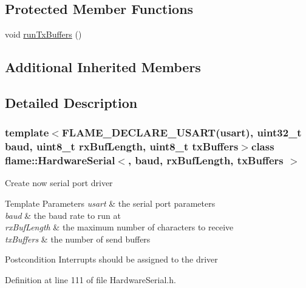 \subsection*{Protected Member Functions}
\begin{DoxyCompactItemize}
\item 
void \hyperlink{classflame_1_1_hardware_serial_a2f045cdba4a0be78d876e383ff1ec6f2}{run\-Tx\-Buffers} ()
\end{DoxyCompactItemize}
\subsection*{Additional Inherited Members}


\subsection{Detailed Description}
\subsubsection*{template$<$F\-L\-A\-M\-E\-\_\-\-D\-E\-C\-L\-A\-R\-E\-\_\-\-U\-S\-A\-R\-T(usart), uint32\-\_\-t baud, uint8\-\_\-t rx\-Buf\-Length, uint8\-\_\-t tx\-Buffers$>$class flame\-::\-Hardware\-Serial$<$, baud, rx\-Buf\-Length, tx\-Buffers $>$}

Create now serial port driver 
\begin{DoxyTemplParams}{Template Parameters}
{\em usart} & the serial port parameters \\
\hline
{\em baud} & the baud rate to run at \\
\hline
{\em rx\-Buf\-Length} & the maximum number of characters to receive \\
\hline
{\em tx\-Buffers} & the number of send buffers \\
\hline
\end{DoxyTemplParams}
\begin{DoxyPostcond}{Postcondition}
Interrupts should be assigned to the driver 
\end{DoxyPostcond}


Definition at line 111 of file Hardware\-Serial.\-h.



